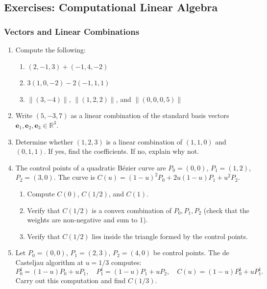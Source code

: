 
\subsection*{Exercises: Computational Linear Algebra}

\subsubsection*{Vectors and Linear Combinations}

\begin{enumerate}

\item Compute the following:
\begin{enumerate}
  \item $(2, -1, 3) + (-1, 4, -2)$
  \item $3(1, 0, -2) - 2(-1, 1, 1)$
  \item $\|(3, -4)\|$, $\|(1, 2, 2)\|$, and $\|(0, 0, 0, 5)\|$
\end{enumerate}

\item Write $(5, -3, 7)$ as a linear combination of the standard basis
vectors $\mathbf{e}_1, \mathbf{e}_2, \mathbf{e}_3 \in \mathbb{R}^3$.

\item Determine whether $(1, 2, 3)$ is a linear combination of
$(1, 1, 0)$ and $(0, 1, 1)$.
If yes, find the coefficients. If no, explain why not.

\item The control points of a quadratic Bézier curve are
$P_0 = (0,0)$, $P_1 = (1,2)$, $P_2 = (3,0)$.
The curve is $C(u) = (1-u)^2 P_0 + 2u(1-u)P_1 + u^2 P_2$.
\begin{enumerate}
  \item Compute $C(0)$, $C(1/2)$, and $C(1)$.
  \item Verify that $C(1/2)$ is a convex combination of $P_0, P_1, P_2$
        (check that the weights are non-negative and sum to 1).
  \item Verify that $C(1/2)$ lies inside the triangle formed by the control points.
\end{enumerate}

\item Let $P_0 = (0,0)$, $P_1 = (2,3)$, $P_2 = (4,0)$ be control points.
The de Casteljau algorithm at $u = 1/3$ computes:
\[
  P_0^1 = (1-u)P_0 + uP_1, \quad P_1^1 = (1-u)P_1 + uP_2, \quad
  C(u) = (1-u)P_0^1 + uP_1^1.
\]
Carry out this computation and find $C(1/3)$.


\end{enumerate}

